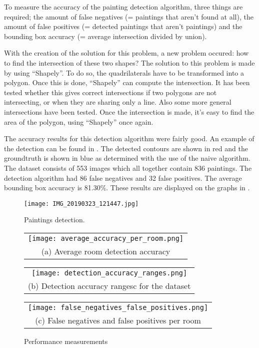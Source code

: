 To measure the accuracy of the painting detection algorithm, three things are required; the amount of false negatives (= paintings that aren't found at all), the amount of false positives (= detected paintings that aren't paintings) and the bounding box accuracy (= average intersection divided by union).

With the creation of the solution for this problem, a new problem occured: how to find the intersection of these two shapes? The solution to this problem is made by using ``Shapely''. To do so, the quadrilaterals have to be transformed into a polygon. Once this is done, ``Shapely'' can compute the intersection. It has been tested whether this gives correct intersections if two polygons are not intersecting, or when they are sharing only a line. Also some more general intersections have been tested. Once the intersection is made, it's easy to find the area of the polygon, using ``Shapely'' once again.

The accuracy results for this detection algorithm were fairly good. An example of the detection can be found in . The detected contours are shown in red and the groundtruth is shown in blue as determined with the use of the naive algorithm. The dataset consists of 553 images which all together contain 836 paintings. The detection algorithm had 86 false negatives and 32 false positives. The average bounding box accuracy is 81.30\%. These results are displayed on the graphs in .

\begin{figure}[h]
    \texttt{[image: IMG\_20190323\_121447.jpg]}
    \centering
    \caption{Paintings detection.}
    \label{fig:paiting_detection_with_ground_truth}
\end{figure}

\begin{figure}
    \centering
    \begin{tabular}{@{}c@{}}
        \texttt{[image: average\_accuracy\_per\_room.png]} \\[\abovecaptionskip]
        \small (a) Average room detection accuracy
    \end{tabular}

    \vspace{\floatsep}

    \begin{tabular}{@{}c@{}}
        \texttt{[image: detection\_accuracy\_ranges.png]} \\[\abovecaptionskip]
        \small (b) Detection accuracy rangesc for the dataset
    \end{tabular}

    \begin{tabular}{@{}c@{}}
        \texttt{[image: false\_negatives\_false\_positives.png]} \\[\abovecaptionskip]
        \small (c) False negatives and false positives per room
    \end{tabular}

    \caption{Performance measurements}
    \label{fig:performance-measurements}
\end{figure}

